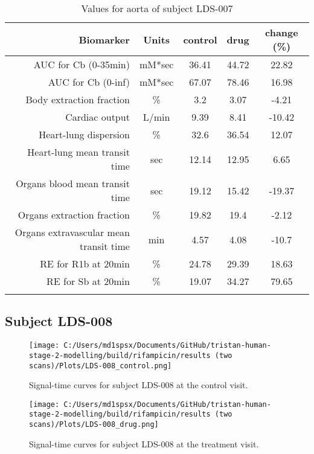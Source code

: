 \documentclass{epflreport}%
\begin{document}
\begin{longtable}{rcccc}%
\hline%
Biomarker&Units&control&drug&change (\%)\\%
\hline%
AUC for Cb (0{-}35min)&mM*sec&36.41&44.72&22.82\\%
AUC for Cb (0{-}inf)&mM*sec&67.07&78.46&16.98\\%
Body extraction fraction&\%&3.2&3.07&{-}4.21\\%
Cardiac output&L/min&9.39&8.41&{-}10.42\\%
Heart{-}lung dispersion&\%&32.6&36.54&12.07\\%
Heart{-}lung mean transit time&sec&12.14&12.95&6.65\\%
Organs blood mean transit time&sec&19.12&15.42&{-}19.37\\%
Organs extraction fraction&\%&19.82&19.4&{-}2.12\\%
Organs extravascular mean transit time&min&4.57&4.08&{-}10.7\\%
RE for R1b at 20min&\%&24.78&29.39&18.63\\%
RE for Sb at 20min&\%&19.07&34.27&79.65\\%
\hline%
\caption{Values for aorta of subject LDS-007} \\%
\end{longtable}%
\clearpage%
\subsection{Subject LDS{-}008}%
\label{subsec:SubjectLDS{-}008}%

%


\begin{figure}[h!]%
\centering%
\texttt{[image: C:/Users/md1spsx/Documents/GitHub/tristan-human-stage-2-modelling/build/rifampicin/results (two scans)/Plots/LDS-008\_control.png]}%
\caption{Signal{-}time curves for subject LDS{-}008 at the control visit.}%
\end{figure}

%


\begin{figure}[h!]%
\centering%
\texttt{[image: C:/Users/md1spsx/Documents/GitHub/tristan-human-stage-2-modelling/build/rifampicin/results (two scans)/Plots/LDS-008\_drug.png]}%
\caption{Signal{-}time curves for subject LDS{-}008 at the treatment visit.}%
\end{figure}
\end{document}

